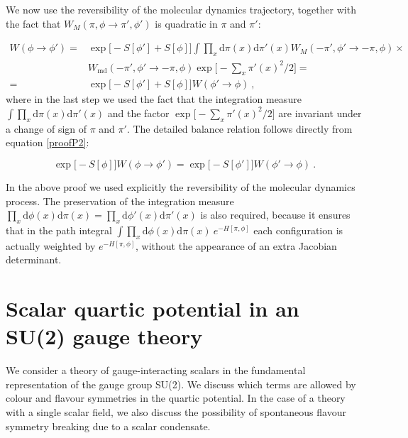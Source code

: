 We now use the  reversibility of the molecular dynamics trajectory, together with the fact that $W_M(\pi,\phi \to \pi',\phi')$ is quadratic in $\pi$ and $\pi'$:

\begin{equation}
\begin{split}
W(\phi \to \phi') = & \exp \bigl[ - S[\phi'] + S[\phi] \bigr] \int \prod_{x} \mathrm{d} \pi(x) \mathrm{d} \pi'(x) W_M(-\pi',\phi' \to -\pi,\phi) \times \\
& W_{\mathrm{md}}(-\pi',\phi' \to -\pi,\phi) \exp \bigl[ -\sum_x \pi'(x)^2 /2 \bigr] = \\
= &  \exp \bigl[ - S[\phi'] + S[\phi] \bigr] W(\phi' \to \phi) \: ,
\end{split}
\label{proofP2}
\end{equation}
%
where in the last step we used the fact that the integration measure $ \int \prod_{x} \mathrm{d} \pi(x) \mathrm{d} \pi'(x)$ and the factor $\exp \bigl[ -\sum_x \pi'(x)^2 /2 \bigr]$ are invariant under a change of sign of $\pi$ and $\pi'$. The detailed balance relation follows directly from equation \ref{proofP2}:

\begin{equation}
\exp \bigl[ -  S[\phi] \bigr]W(\phi \to \phi') =\exp \bigl[ - S[\phi'] \bigr] W(\phi' \to \phi) \: .
\end{equation}

In the above proof we used explicitly the reversibility of the molecular dynamics process. The preservation of the integration measure $ \prod_{x} \mathrm{d} \phi(x) \mathrm{d} \pi(x) =  \prod_{x} \mathrm{d} \phi'(x) \mathrm{d} \pi'(x)$ is also required, because it ensures that in the path integral  $\int \prod_{x} \mathrm{d} \phi(x) \mathrm{d} \pi(x) \: e^{-H[\pi,\phi]}$ each configuration is actually weighted by $e^{-H[\pi,\phi]}$, without the appearance of an extra Jacobian determinant. 


\section{Scalar quartic potential in an SU(2) gauge theory}
\label{app_quartic_potential}

We consider a theory of gauge-interacting scalars in the fundamental representation of the gauge group SU(2). We discuss which terms are allowed by colour and flavour symmetries in the quartic potential. In the case of a theory with a single scalar field, we also discuss the possibility of spontaneous flavour symmetry breaking due to a scalar condensate.

